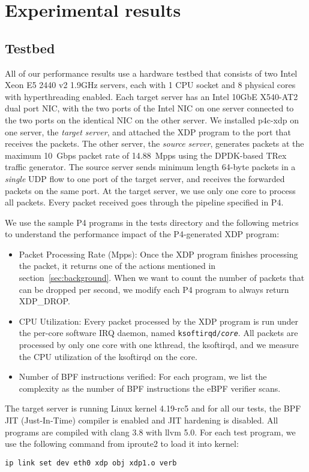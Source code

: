 \section{Experimental results}\label{sec:results}
\subsection{Testbed}
All of our performance results use a hardware testbed that consists of
two Intel Xeon E5 2440 v2 1.9GHz servers, each with 1 CPU socket and
8 physical cores with hyperthreading enabled.
Each target server has an Intel 10GbE X540-AT2 dual
port NIC, with the two ports of the Intel NIC on one server connected
to the two ports on the identical NIC on the other server.
We installed p4c-xdp on one server, the {\em target server}, and
attached the XDP program to the port that receives the packets.
The other server, the {\em source server}, generates packets
at the maximum 10~Gbps packet rate of 14.88~Mpps using the DPDK-based
TRex~\cite{trex} traffic generator.  The source server sends minimum
length 64-byte packets in a {\em single} UDP flow to one port of the
target server, and receives the forwarded packets on the same port.
At the target server, we use only one core to process all packets.
Every packet received goes through the pipeline specified in P4.

We use the sample P4 programs in the tests directory and the following
metrics to understand the performance impact of the P4-generated XDP
program:
\begin{itemize}
\item Packet Processing Rate (Mpps): Once the XDP program finishes
  processing the packet, it returns one of the actions mentioned in
  section~\ref{sec:background}.  When we want to count the number of
  packets that can be dropped per second, we modify each P4 program to
  always return XDP\_DROP.
\item CPU Utilization: Every packet processed by the XDP program is run
  under the per-core software IRQ daemon, named
  \texttt{ksoftirqd/\textit{core}}.  All packets are processed by only
  one core with one kthread, the ksoftirqd, and we measure the CPU
  utilization of the ksoftirqd on the core.
\item Number of BPF instructions verified: For each program, we list
  the complexity as the number of BPF instructions the eBPF
  verifier scans.
\end{itemize}

The target server is running Linux kernel 4.19-rc5 and for all our
tests, the BPF JIT (Just-In-Time) compiler is enabled and JIT hardening
is disabled. All programs are compiled with clang 3.8 with llvm 5.0.
For each test program, we use the following
command from iproute2 to load it into kernel:
\begin{lstlisting}[frame=none]
ip link set dev eth0 xdp obj xdp1.o verb
\end{lstlisting}

